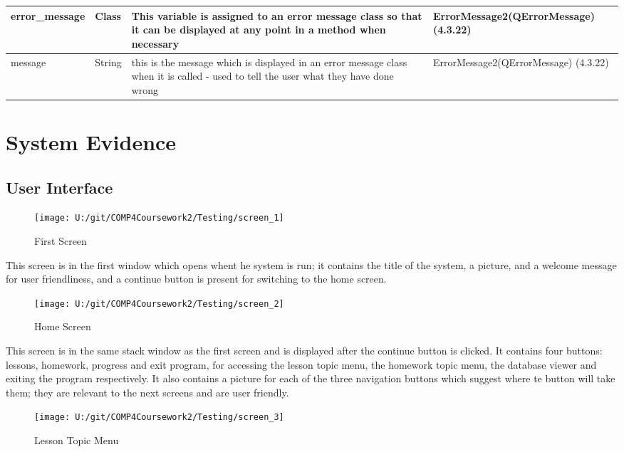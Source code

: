 \begin{center}
\begin{longtable}{|p{3cm}|p{3cm}|p{4cm}|p{4cm}|}
error\_message & Class & This variable is assigned to an error message class so that it can be displayed at any point in a method when necessary & ErrorMessage2(QErrorMessage) (4.3.22) \\ \hline
message & String & this is the message which is displayed in an error message class when it is called - used to tell the user what they have done wrong & ErrorMessage2(QErrorMessage) (4.3.22) \\ \hline
\end{longtable}
\end{center}

\section{System Evidence}

\subsection{User Interface}

\begin{figure}[H]
    \label{fig: Second Screen}\caption{First Screen}
    \texttt{[image: U:/git/COMP4Coursework2/Testing/screen\_1]}
\end{figure}

This screen is in the first window which opens whent he system is run; it contains the title of the system, a picture, and a welcome message for user friendliness, and a continue button is present for switching to the home screen.

\begin{figure}[H]
    \label{fig: Second Screen}\caption{Home Screen}
    \texttt{[image: U:/git/COMP4Coursework2/Testing/screen\_2]}
\end{figure}

This screen is in the same stack window as the first screen and is displayed after the continue button is clicked. It contains four buttons: lessons, homework, progress and exit program, for accessing the lesson topic menu, the homework topic menu, the database viewer and exiting the program respectively. It also contains a picture for each of the three navigation buttons which suggest where te button will take them; they are relevant to the next screens and are user friendly.

\begin{figure}[H]
    \label{fig: Second Screen}\caption{Lesson Topic Menu}
    \texttt{[image: U:/git/COMP4Coursework2/Testing/screen\_3]}
\end{figure}

